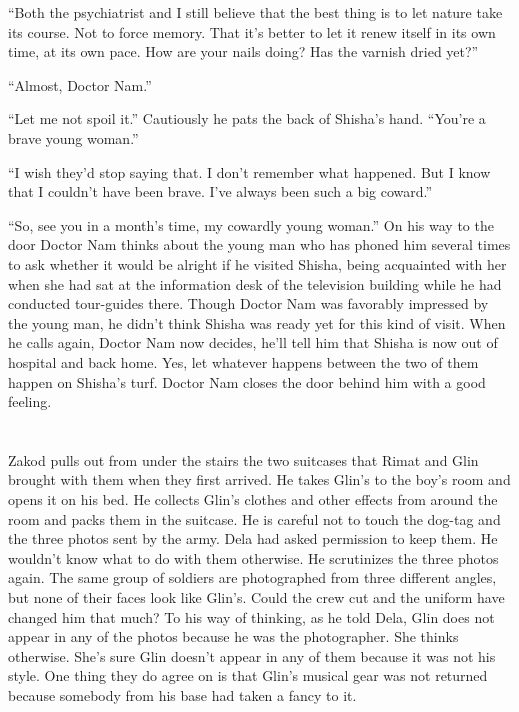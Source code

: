 \documentclass[twoside,11pt,openany]{book}
\begin{document}
``Both the psychiatrist and I still believe that the best thing is to let nature take its course. Not to
force memory. That it's better to let it renew itself in its own time, at its own pace. How are your nails doing? Has
the varnish dried yet?''

``Almost, Doctor Nam.''

``Let me not spoil it.'' Cautiously he pats the back of Shisha's hand. ``You're a
brave young woman.''

``I wish they'd stop saying that. I don't remember what happened. But I know that I couldn't have been
brave. I've always been such a big coward.''

``So, see you in a month's time, my cowardly young woman.'' On his way to the door Doctor
Nam thinks about the young man who has phoned him several times to ask whether it would be alright if he visited
Shisha, being acquainted with her when she had sat at the information desk of the television building while he had
conducted tour-guides there. Though Doctor Nam was favorably impressed by the young man, he didn't think Shisha was
ready yet for this kind of visit. When he calls again, Doctor Nam now decides, he'll tell him that Shisha is now out of
hospital and back home. Yes, let whatever happens between the two of them happen on Shisha's turf. Doctor Nam closes
the door behind him with a good feeling.


\bigskip

\chapter{}

Zakod pulls out from under the stairs the two suitcases that Rimat and Glin brought with them when they first arrived.
He takes Glin's to the boy's room and opens it on his bed. He collects Glin's clothes and other effects from around the
room and packs them in the suitcase. He is careful not to touch the dog-tag and the three photos sent by the army. Dela
had asked permission to keep them.
He wouldn{'}t know what to do with them otherwise.
He scrutinizes the three
photos again. The same group of soldiers are photographed from three different angles, but none of their faces look
like Glin's. Could the crew cut and the uniform have changed him that much?  To his way of thinking, as he told
Dela, Glin does not appear in any of the photos because he was the photographer. She thinks otherwise. She's sure Glin
doesn't appear in any of them because it was not his style.  One thing they do agree on is that Glin's musical gear
was not returned because somebody from his base had taken a fancy to it.
\end{document}
